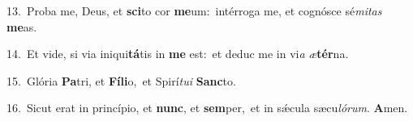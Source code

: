 {\numbfont\textcolor{\numbcolor}{13.}}~Proba me, Deus, et \textbf{sci}\-to cor \textbf{me}\-um:~\star intérroga me, et cognósce sé\-\textit{mi}\-\textit{tas} \textbf{me}\-as.\par
{\numbfont\textcolor{\numbcolor}{14.}}~Et vide, si via iniqui\-\textbf{tá}\-tis in \textbf{me} est:~\star et deduc me in vi\textit{a} \textit{æ}\-\textbf{tér}na.\par
{\numbfont\textcolor{\numbcolor}{15.}}~Glória \textbf{Pa}\-tri, et \textbf{Fí}\-\textbf{li}o,~\star et Spirí\-\textit{tu}\-\textit{i} \textbf{Sanc}\-to.\par
{\numbfont\textcolor{\numbcolor}{16.}}~Sicut erat in princípio, et \textbf{nunc}\-, et \textbf{sem}\-per,~\star et in sǽcula sæcu\-\textit{ló}\-\textit{rum}. \textbf{A}\-men.\par
